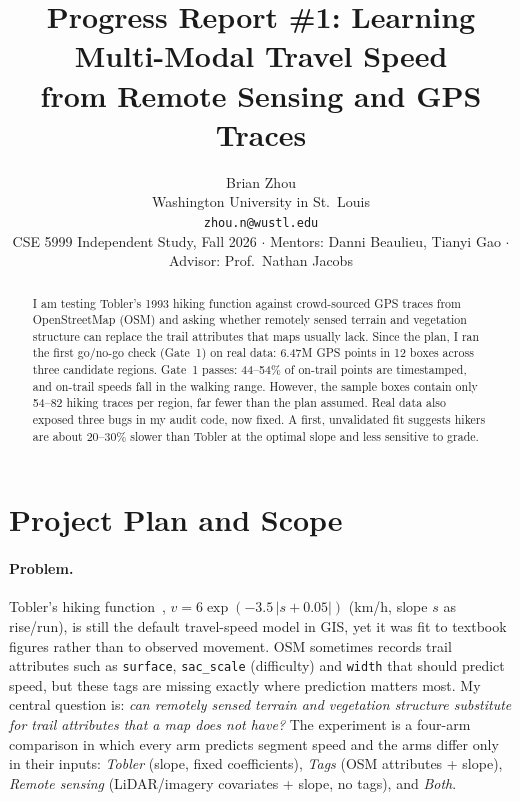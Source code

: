 \documentclass[10pt,twocolumn,letterpaper]{article}
\begin{document}
\title{Progress Report \#1: Learning Multi-Modal Travel Speed\\from Remote Sensing and GPS Traces}

\author{Brian Zhou\\
Washington University in St.\ Louis\\
{\tt\small zhou.n@wustl.edu}\\
{\small CSE 5999 Independent Study, Fall 2026 \;$\cdot$\; Mentors: Danni Beaulieu, Tianyi Gao \;$\cdot$\; Advisor: Prof.\ Nathan Jacobs}
}
\maketitle

\begin{abstract}
I am testing Tobler's 1993 hiking function against crowd-sourced GPS traces from OpenStreetMap (OSM) and asking whether remotely sensed terrain and vegetation structure can replace the trail attributes that maps usually lack. Since the plan, I ran the first go/no-go check (Gate~1) on real data: 6.47M GPS points in 12 boxes across three candidate regions. Gate~1 passes: 44--54\% of on-trail points are timestamped, and on-trail speeds fall in the walking range. However, the sample boxes contain only 54--82 hiking traces per region, far fewer than the plan assumed. Real data also exposed three bugs in my audit code, now fixed. A first, unvalidated fit suggests hikers are about 20--30\% slower than Tobler at the optimal slope and less sensitive to grade.
\end{abstract}

\section{Project Plan and Scope}
\label{sec:plan}

\paragraph{Problem.} Tobler's hiking function~\cite{tobler1993}, $v = 6\exp(-3.5\,|s+0.05|)$ (km/h, slope $s$ as rise/run), is still the default travel-speed model in GIS, yet it was fit to textbook figures rather than to observed movement. OSM sometimes records trail attributes such as \texttt{surface}, \texttt{sac\_scale} (difficulty) and \texttt{width} that should predict speed, but these tags are missing exactly where prediction matters most. My central question is: \emph{can remotely sensed terrain and vegetation structure substitute for trail attributes that a map does not have?} The experiment is a four-arm comparison in which every arm predicts segment speed and the arms differ only in their inputs: \emph{Tobler} (slope, fixed coefficients), \emph{Tags} (OSM attributes + slope), \emph{Remote sensing} (LiDAR/imagery covariates + slope, no tags), and \emph{Both}.
\end{document}
